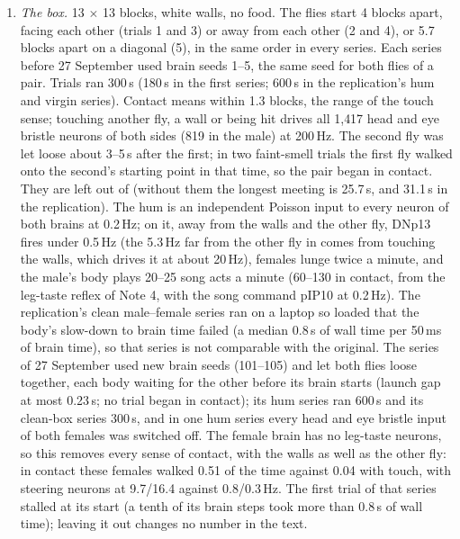 \documentclass[11pt,a4paper]{article}
\begin{document}
\begin{enumerate}[leftmargin=*, label=\arabic*., itemsep=4pt]
\item \emph{The box.} 13 $\times$ 13 blocks, white walls, no food. The flies start 4 blocks apart, facing each other (trials 1 and 3) or away from each other (2 and 4), or 5.7 blocks apart on a diagonal (5), in the same order in every series. Each series before 27 September used brain seeds 1--5, the same seed for both flies of a pair. Trials ran 300\,s (180\,s in the first series; 600\,s in the replication's hum and virgin series). Contact means within 1.3 blocks, the range of the touch sense; touching another fly, a wall or being hit drives all 1{,}417 head and eye bristle neurons of both sides (819 in the male) at 200\,Hz. The second fly was let loose about 3--5\,s after the first; in two faint-smell trials the first fly walked onto the second's starting point in that time, so the pair began in contact. They are left out of  (without them the longest meeting is 25.7\,s, and 31.1\,s in the replication). The hum is an independent Poisson input to every neuron of both brains at 0.2\,Hz; on it, away from the walls and the other fly, DNp13 fires under 0.5\,Hz (the 5.3\,Hz far from the other fly in  comes from touching the walls, which drives it at about 20\,Hz), females lunge twice a minute, and the male's body plays 20--25 song acts a minute (60--130 in contact, from the leg-taste reflex of Note 4, with the song command pIP10 at 0.2\,Hz). The replication's clean male--female series ran on a laptop so loaded that the body's slow-down to brain time failed (a median 0.8\,s of wall time per 50\,ms of brain time), so that series is not comparable with the original. The series of 27 September used new brain seeds (101--105) and let both flies loose together, each body waiting for the other before its brain starts (launch gap at most 0.23\,s; no trial began in contact); its hum series ran 600\,s and its clean-box series 300\,s, and in one hum series every head and eye bristle input of both females was switched off. The female brain has no leg-taste neurons, so this removes every sense of contact, with the walls as well as the other fly: in contact these females walked 0.51 of the time against 0.04 with touch, with steering neurons at 9.7/16.4 against 0.8/0.3\,Hz. The first trial of that series stalled at its start (a tenth of its brain steps took more than 0.8\,s of wall time); leaving it out changes no number in the text.


\end{enumerate}
\end{document}
